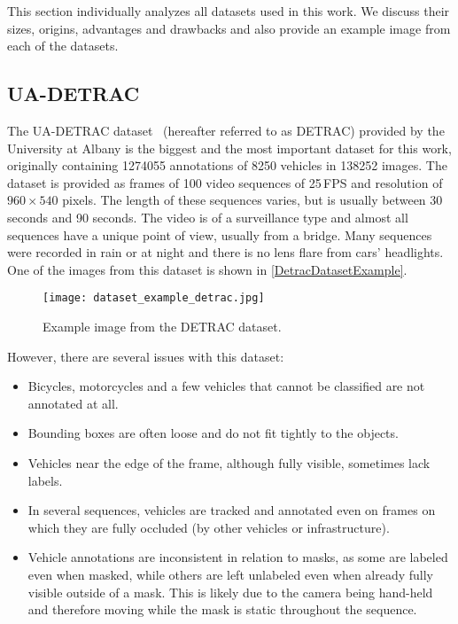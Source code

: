 
This section individually analyzes all datasets used in this work. We discuss
their sizes, origins, advantages and drawbacks and also provide an example image
from each of the datasets.


\subsection{UA-DETRAC}
\label{DetracDataset}

The UA-DETRAC dataset~\cite{detrac} (hereafter referred to as DETRAC) provided by the University at Albany is the
biggest and the most important dataset for this work, originally containing
\num{1274055} annotations of \num{8250} vehicles in \num{138252} images. The
dataset is provided as frames of 100 video sequences of 25\,FPS and
resolution of $960 \times 540$ pixels. The length of these sequences varies,
but is usually between 30 seconds and 90 seconds. The video is of a surveillance
type and almost all sequences have a unique point of view, usually from a
bridge. Many sequences were recorded in rain or at night and there is no lens
flare from cars' headlights. One of the images from this dataset is shown in
\autoref{DetracDatasetExample}.

\begin{figure}[t]
    \centering
    \texttt{[image: dataset\_example\_detrac.jpg]}
    \caption{Example image from the DETRAC dataset.}
    \label{DetracDatasetExample}
\end{figure}

However, there are several issues with this dataset:
\begin{itemize}
    \item Bicycles, motorcycles and a few vehicles that cannot be classified are
    not annotated at all.
    \item Bounding boxes are often loose and do not fit tightly to the objects.
    \item Vehicles near the edge of the frame, although fully visible, sometimes
    lack labels.
    \item In several sequences, vehicles are tracked and annotated even on
    frames on which they are fully occluded (by other vehicles or
    infrastructure).
    \item Vehicle annotations are inconsistent in relation to masks, as some are
    labeled even when masked, while others are left unlabeled even when already
    fully visible outside of a mask. This is likely due to the camera being
    hand-held and therefore moving while the mask is static throughout the
    sequence.
\end{itemize}

